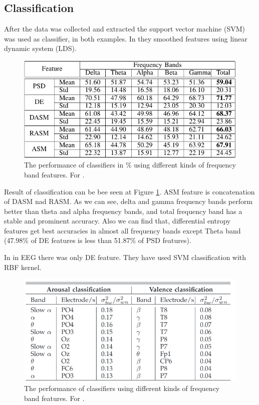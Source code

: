 \documentclass[10pt,journal,compsoc,twoside]{IEEEtran}
\newcommand{\Ref}[2]{#2 \ref{#1}}
\begin{document}
\subsection{Classification}
After the data was collected and extracted the support vector machine (SVM) was used as classifier, in both examples.
In  \cite{WeiLongBoNanBaoLiang2014} they smoothed features using linear dynamic system (LDS).

\begin{figure}[ht]
	\centering
	\includegraphics[width=1.0\linewidth]{performanceOfClassifier1}
	\caption{The performance of classifiers in \% using different kinds of frequency band features. For \cite{WeiLongBoNanBaoLiang2014}.}
	\label{fig:performanceofclassifier1}
\end{figure}
Result of classification can be bee seen at \Ref{fig:performanceofclassifier1}{Figure}. ASM feature is concatenation of DASM nad RASM. As we can see, delta and gamma frequency bands perform better than theta and alpha frequency bands, and total frequency band has a stable and  prominent  accuracy.  Also  we  can  find  that,  differential entropy features get best accuracies in almost all frequency  bands  except  Theta  band  (47.98\%  of  DE  features is  less  than  51.87\%  of  PSD  features).
\newline
\par In \cite{SoleymaniPanticPun2002} in EEG there was only DE feature. They have used SVM classification with RBF kernel.
\begin{figure}[ht]
	\centering
	\includegraphics[width=1.0\linewidth]{performanceOfClassifier2}
	\caption{The performance of classifiers using different kinds of frequency band features. For \cite{SoleymaniPanticPun2002}.}
	\label{fig:performanceofclassifier2}
\end{figure}
\end{document}
